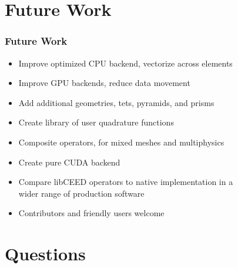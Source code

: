 \documentclass{beamer}
\begin{document}
\section{Future Work}


\begin{frame}
\begin{center}
\frametitle{Future Work}

\begin{itemize}

\item Improve optimized CPU backend, vectorize across elements\\

\item Improve GPU backends, reduce data movement\\

\item Add additional geometries, tets, pyramids, and prisms\\

\item Create library of user quadrature functions\\

\item Composite operators, for mixed meshes and multiphysics\\

\item Create pure CUDA backend\\

\item Compare libCEED operators to native implementation in a\\ wider range of production software

\item Contributors and friendly users welcome

\end{itemize}

\end{center}
\end{frame}

\section{Questions}
\end{document}
